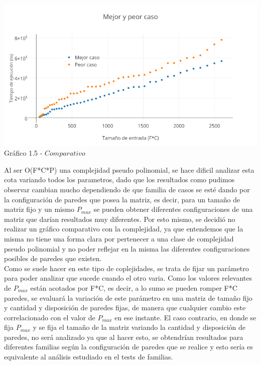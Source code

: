   \vspace*{0.3cm} \vspace*{0.3cm}
  \begin{center}
\includegraphics[scale=0.65]{./EJ1/MejorYPeorCaso.png}
{Gr\'afico 1.5 - $Comparativo$}
  \end{center}
  \vspace*{0.3cm}
  
Al ser O(F*C*P) una complejidad pseudo polinomial, se hace dificil analizar esta cota variando todos los parametros, dado que los resultados como pudimos observar cambian mucho dependiendo de que familia de casos se esté dando por la configuración de paredes que posea la matriz, es decir, para un tamaño de matriz fijo y un mismo $P_{max}$ se pueden obtener diferentes configuraciones de una matriz que darían resultados muy diferentes. Por esto mismo, se decidió no realizar un gr\'afico comparativo con la complejidad, ya que entendemos que la misma no tiene una forma clara por pertenecer a una clase de complejidad pseudo polinomial y no poder reflejar en la misma las diferentes configuraciones posibles de paredes que existen.\\

Como se suele hacer en este tipo de coplejidades, se trata de fijar un parámetro para poder analizar que sucede cuando el otro varia.
Como los valores relevantes de $P_{max}$ están acotados por F*C, es decir, a lo sumo se pueden romper F*C paredes, se evaluará la variación de este parámetro en una matriz de tamaño fijo y cantidad y disposición de paredes fijas, de manera que cualquier cambio este correlacionado con el valor de $P_{max}$ en ese instante.
El caso contrario, en donde se fija $P_{max}$ y se fija el tamaño de la matriz variando la cantidad y disposición de paredes, no será analizado ya que al hacer esto, se obtendrían resultados para diferentes familias según la configuración de paredes que se realice y esto sería
es equivalente al análisis estudiado en el tests de familias.

